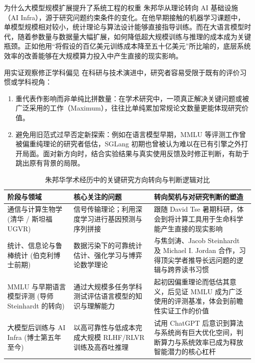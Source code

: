 \documentclass[UTF8,a4paper,11pt,fontset=fandol]{ctexart}
\begin{document}
\begin{importantbox}{为什么大模型规模扩展提升了系统工程的权重}
朱邦华从理论转向 AI 基础设施（AI Infra），源于研究问题约束条件的变化。在他早期接触的机器学习课题中，单模型规模相对较小，统计理论与算法设计能够直接指导训练。而在大语言模型时代，随着参数量与数据量大幅扩展，如何降低超大规模训练与推理的成本成为关键瓶颈。正如他用“将假设的百亿美元训练成本降至五十亿美元”所比喻的，底层系统效率的改善能够在大规模算力投入中产生直接的现实影响。
\end{importantbox}
\begin{warningbox}{用实证观察修正学科偏见}
在科研与技术演进中，研究者容易受限于既有的评价习惯或学科视角：
\begin{enumerate}
\item 重代表作影响而非单纯比拼数量：在学术研究中，一项真正解决关键问题或被广泛采用的工作（Maximum），往往比单纯累加常规论文数量更能体现研究价值。
\item 避免用旧范式过早否定新探索：例如在语言模型早期，MMLU 等评测工作曾被偏重纯理论的研究者低估，SGLang 初期也曾被认为难以在已有引擎之外打开局面。面对新方向时，结合实验结果与真实使用反馈及时修正判断，有助于跳出原有背景的局限。
\end{enumerate}
\end{warningbox}
\begin{table}[H]\centering\small
\caption{朱邦华学术经历中的关键研究方向转向与判断逻辑对比}
\begin{tabular}{>{\raggedright\arraybackslash}p{\dimexpr(\linewidth-6\tabcolsep)/3\relax}>{\raggedright\arraybackslash}p{\dimexpr(\linewidth-6\tabcolsep)/3\relax}>{\raggedright\arraybackslash}p{\dimexpr(\linewidth-6\tabcolsep)/3\relax}}
\toprule
阶段与领域 & 核心关注的问题 & 转向契机与对研究判断的塑造\\\midrule
通信与计算生物学 (清华 / 斯坦福 UGVR) & 信号传输理论；利用深度学习进行基因预测与序列拼接 & 跟随 David Tse 暑期科研，体会到将计算工具用于生命科学能产生直接的现实影响\\[4pt]
统计、信息论与鲁棒统计 (伯克利博士前期) & 数据污染下的可靠统计估计、强化学习与博弈论数学理论 & 与焦剑涛、Jacob Steinhardt 及 Michael I. Jordan 合作，习得顶尖学者推导长远问题的逻辑与跨界读书习惯\\[4pt]
MMLU 与早期语言模型评测 (导师 Steinhardt 的转向) & 通过大规模多任务学科测试评估语言模型的知识与理解能力 & 起初因偏重理论而低估其意义，后见证 MMLU 成为广泛使用的评测基准，体会到前瞻性实证工作的价值\\[4pt]
大模型后训练与 AI Infra (博士第五年至今) & 以高可靠性与低成本完成大规模 RLHF/RLVR 训练及高吞吐推理 & 试用 ChatGPT 后意识到算法与系统尚有巨大优化空间，判断算力与系统效率已成为释放智能潜力的核心杠杆\\[4pt]
\bottomrule\end{tabular}\end{table}
\end{document}

